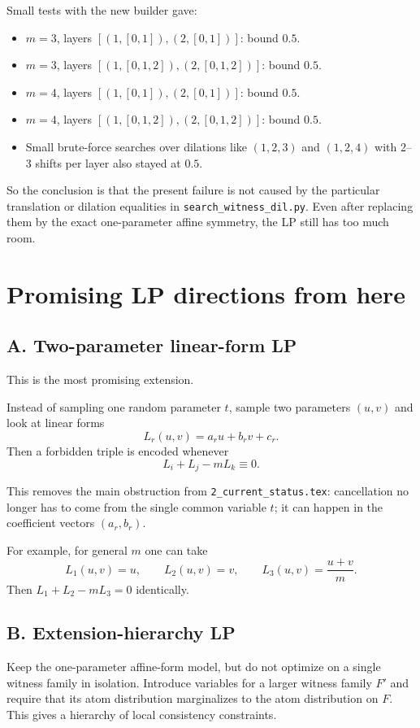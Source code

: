 \documentclass[11pt]{article}
\begin{document}
Small tests with the new builder gave:

\begin{itemize}
\item $m=3$, layers $[(1,[0,1]), (2,[0,1])]$: bound $0.5$.
\item $m=3$, layers $[(1,[0,1,2]), (2,[0,1,2])]$: bound $0.5$.
\item $m=4$, layers $[(1,[0,1]), (2,[0,1])]$: bound $0.5$.
\item $m=4$, layers $[(1,[0,1,2]), (2,[0,1,2])]$: bound $0.5$.
\item Small brute-force searches over dilations like $(1,2,3)$ and $(1,2,4)$ with
2--3 shifts per layer also stayed at $0.5$.
\end{itemize}

So the conclusion is that the present failure is not caused by the particular
translation or dilation equalities in \texttt{search\_witness\_dil.py}. Even after
replacing them by the exact one-parameter affine symmetry, the LP still has too
much room.

\section{Promising LP directions from here}

\subsection*{A. Two-parameter linear-form LP}

This is the most promising extension.

Instead of sampling one random parameter $t$, sample two parameters $(u,v)$ and
look at linear forms
\[
L_r(u,v)=a_ru+b_rv+c_r.
\]
Then a forbidden triple is encoded whenever
\[
L_i+L_j-mL_k\equiv 0.
\]

This removes the main obstruction from \texttt{2\_current\_status.tex}: cancellation
no longer has to come from the single common variable $t$; it can happen in the
coefficient vectors $(a_r,b_r)$.

For example, for general $m$ one can take
\[
L_1(u,v)=u,\qquad
L_2(u,v)=v,\qquad
L_3(u,v)=\frac{u+v}{m}.
\]
Then $L_1+L_2-mL_3=0$ identically.

\subsection*{B. Extension-hierarchy LP}

Keep the one-parameter affine-form model, but do not optimize on a single witness
family in isolation. Introduce variables for a larger witness family $F'$ and
require that its atom distribution marginalizes to the atom distribution on $F$.
This gives a hierarchy of local consistency constraints.
\end{document}
